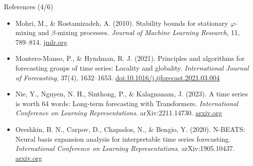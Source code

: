 \begin{frame}{References (4/6)}
\begin{itemize}
    \item Mohri, M., \& Rostamizadeh, A. (2010). Stability bounds for stationary $\varphi$-mixing and $\beta$-mixing processes. \textit{Journal of Machine Learning Research}, 11, 789--814. \href{https://jmlr.org/papers/v11/mohri10a.html}{jmlr.org}
    \item Montero-Manso, P., \& Hyndman, R. J. (2021). Principles and algorithms for forecasting groups of time series: Locality and globality. \textit{International Journal of Forecasting}, 37(4), 1632--1653. \href{https://doi.org/10.1016/j.ijforecast.2021.03.004}{doi:10.1016/j.ijforecast.2021.03.004}
    \item Nie, Y., Nguyen, N. H., Sinthong, P., \& Kalagnanam, J. (2023). A time series is worth 64 words: Long-term forecasting with Transformers. \textit{International Conference on Learning Representations}. arXiv:2211.14730. \href{https://arxiv.org/abs/2211.14730}{arxiv.org}
    \item Oreshkin, B. N., Carpov, D., Chapados, N., \& Bengio, Y. (2020). N-BEATS: Neural basis expansion analysis for interpretable time series forecasting. \textit{International Conference on Learning Representations}. arXiv:1905.10437. \href{https://arxiv.org/abs/1905.10437}{arxiv.org}
\end{itemize}
\end{frame}

